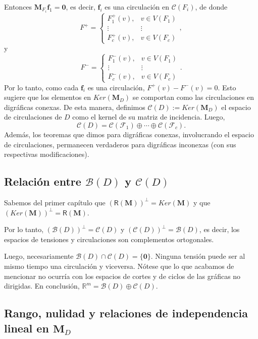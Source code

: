 Entonces $\mathbf{M}_{F_{i}}\mathbf{f}_{1} = \mathbf{0}$, es decir, $\mathbf{f}_{i}$ es una circulación en $\mathcal{C}(F_{i})$, de donde 
$$
F^{+} = \left\{\begin{matrix}
F^{+}_{1}(v), & v \in V(F_{1}) \\
\vdots & \vdots \\
F^{+}_{c}(v), & v \in V(F_{c})    
\end{matrix}\right.,
$$
y
$$
F^{-} = \left\{\begin{matrix}
F^{-}_{1}(v), & v \in V(F_{1}) \\
\vdots & \vdots \\
F^{-}_{c}(v), & v \in V(F_{c})    
\end{matrix}\right..
$$
Por lo tanto, como cada $\mathbf{f}_{i}$ es una circulación, $F^{+}(v) - F^{-}(v) = 0$. Esto sugiere que los elementos en $Ker(\mathbf{M}_{D})$ se comportan como las circulaciones en digráficas conexas. De esta manera, definimos $\mathcal{C}(D) := Ker(\mathbf{M}_{D})$ el espacio de circulaciones de $D$ como el kernel de su matriz de incidencia. Luego, $$\mathcal{C}(D) = \mathcal{C}(\mathcal{F}_{1}) \oplus \cdots \oplus \mathcal{C}(\mathcal{F}_{c}).$$ Además, los teoremas que dimos para digráficas conexas, involucrando el espacio de circulaciones, permanecen verdaderos para digráficas inconexas (con sus respectivas modificaciones).

\subsection{Relación entre $\mathcal{B}(D)$ y $\mathcal{C}(D)$}

Sabemos del primer capítulo que $(\mathsf{R}(\mathbf{M}))^{\perp}=Ker(\mathbf{M})$ y que $(Ker(\mathbf{M}))^{\perp} = \mathsf{R}(\mathbf{M})$.

Por lo tanto, $(\mathcal{B}(D))^{\perp} = \mathcal{C}(D)$ y $(\mathcal{C}(D))^{\perp} = \mathcal{B}(D)$, es decir, los espacios de tensiones y circulaciones son complementos ortogonales.

Luego, necesariamente $\mathcal{B}(D) \cap \mathcal{C}(D) = \{\mathbf{0}\}$. Ninguna tensión puede ser al mismo tiempo una circulación y viceversa. Nótese que lo que acabamos de mencionar no ocurría con los espacios de cortes y de ciclos de las gráficas no dirigidas. En conclusión, $\mathbb{R}^{m} = \mathcal{B}(D) \oplus \mathcal{C}(D)$.

\subsection{Rango, nulidad y relaciones de independencia lineal en $\mathbf{M}_{D}$}

